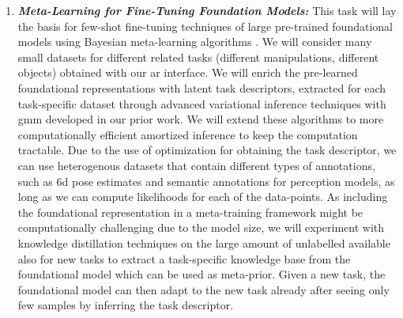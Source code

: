 \documentclass{erc-B2}
\begin{document}
\begin{enumerate}
\item \textit{\textbf{Meta-Learning for Fine-Tuning Foundation Models:}} This task will lay the basis for few-shot fine-tuning techniques of large pre-trained foundational models \cite{SAM,rtx2023arxiv,rt22023arxiv}  using  Bayesian meta-learning algorithms \cite{volpp2021bayesian,Volpp23}. 
We will consider many small datasets for different related tasks (different manipulations, different objects) obtained with our \gls*{ar} interface. 
We will enrich the pre-learned foundational representations with latent task descriptors, extracted for each task-specific dataset through advanced variational inference techniques with \gls*{gmm} \cite{arenz2020trust, arenz2022unified} developed in our prior work. We will extend these algorithms to more computationally efficient amortized inference to keep the computation tractable.
Due to the use of optimization for obtaining the task descriptor, we can use heterogenous datasets that contain different types of annotations, such as \gls*{6d} pose estimates and semantic annotations for perception models, as long as we can compute likelihoods for each of the data-points. 
As including the foundational representation in a meta-training framework might be computationally challenging due to the model size, we will experiment with knowledge distillation techniques \cite{Sun_2023_ICCV,NEURIPS2021_376c6b9f} on the large amount of unlabelled available also for new tasks to extract a task-specific knowledge base from the foundational model which can be used as meta-prior.
Given a new task, the foundational model can then adapt to the new task already after seeing only few samples by inferring the task descriptor. %


\end{enumerate}
\end{document}
